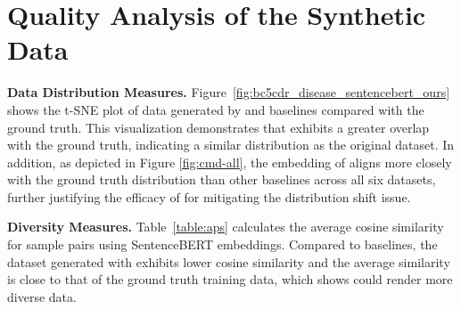 \section{Quality Analysis of the Synthetic Data}
\label{sec:quality_analysis}
\textbf{Data Distribution Measures.}
Figure~\ref{fig:bc5cdr_disease_sentencebert_ours} shows the t-SNE plot of data generated by {\ours} and baselines compared with the ground truth. This visualization demonstrates that {\ours} exhibits a greater overlap with the ground truth, indicating a similar distribution as the original dataset.
In addition, as depicted in Figure \ref{fig:cmd-all}, the embedding of \textit{\ours} aligns more closely with the ground truth distribution than other baselines across all six datasets, further justifying the efficacy of {\ours} for mitigating the distribution shift issue.

\begin{table}[t]
  \caption{Average Pairwise Similarity. \vspace{-3ex}}
  \label{table:aps}
  \vspace{-1ex}
\end{table}

\noindent \textbf{Diversity Measures.}
\label{sec:diversity_measures}
Table~\ref{table:aps} calculates the average cosine similarity for sample pairs using SentenceBERT embeddings.
Compared to baselines, the dataset generated with {\ours} exhibits lower cosine similarity and the average similarity is close to that of the ground truth training data, which shows {\ours} could render more diverse data.  

